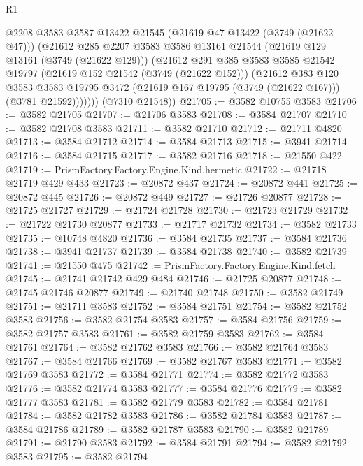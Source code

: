 \begin{lexlean}{R1}
\begin{coremodule}
            @2208
            @3583
            @3587
            @13422
            @21545
            (@21619 @47 @13422 (@3749 (@21622 @47)))
            (@21612
              @285
              @2207
              @3583
              @3586
              @13161
              @21544
              (@21619 @129 @13161 (@3749 (@21622 @129)))
              (@21612
                @291
                @385
                @3583
                @3585
                @21542
                @19797
                (@21619 @152 @21542 (@3749 (@21622 @152)))
                (@21612
                  @383
                  @120
                  @3583
                  @3583
                  @19795
                  @3472
                  (@21619 @167 @19795 (@3749 (@21622 @167)))
                  (@3781 @21592)))))))
      (@7310 @21548))
@21705 := @3582 @10755 @3583
@21706 := @3582 @21705
@21707 := @21706 @3583
@21708 := @3584 @21707
@21710 := @3582 @21708 @3583
@21711 := @3582 @21710
@21712 := @21711 @4820
@21713 := @3584 @21712
@21714 := @3584 @21713
@21715 := @3941 @21714
@21716 := @3584 @21715
@21717 := @3582 @21716
@21718 := @21550 @422
@21719 := PrismFactory.Factory.Engine.Kind.hermetic
@21722 := @21718 @21719 @429 @433
@21723 := @20872 @437
@21724 := @20872 @441
@21725 := @20872 @445
@21726 := @20872 @449
@21727 := @21726 @20877
@21728 := @21725 @21727
@21729 := @21724 @21728
@21730 := @21723 @21729
@21732 := @21722 @21730 @20877
@21733 := @21717 @21732
@21734 := @3582 @21733
@21735 := @10748 @4820
@21736 := @3584 @21735
@21737 := @3584 @21736
@21738 := @3941 @21737
@21739 := @3584 @21738
@21740 := @3582 @21739
@21741 := @21550 @475
@21742 := PrismFactory.Factory.Engine.Kind.fetch
@21745 := @21741 @21742 @429 @484
@21746 := @21725 @20877
@21748 := @21745 @21746 @20877
@21749 := @21740 @21748
@21750 := @3582 @21749
@21751 := @21711 @3583
@21752 := @3584 @21751
@21754 := @3582 @21752 @3583
@21756 := @3582 @21754 @3583
@21757 := @3584 @21756
@21759 := @3582 @21757 @3583
@21761 := @3582 @21759 @3583
@21762 := @3584 @21761
@21764 := @3582 @21762 @3583
@21766 := @3582 @21764 @3583
@21767 := @3584 @21766
@21769 := @3582 @21767 @3583
@21771 := @3582 @21769 @3583
@21772 := @3584 @21771
@21774 := @3582 @21772 @3583
@21776 := @3582 @21774 @3583
@21777 := @3584 @21776
@21779 := @3582 @21777 @3583
@21781 := @3582 @21779 @3583
@21782 := @3584 @21781
@21784 := @3582 @21782 @3583
@21786 := @3582 @21784 @3583
@21787 := @3584 @21786
@21789 := @3582 @21787 @3583
@21790 := @3582 @21789
@21791 := @21790 @3583
@21792 := @3584 @21791
@21794 := @3582 @21792 @3583
@21795 := @3582 @21794

\end{coremodule}
\end{lexlean}
